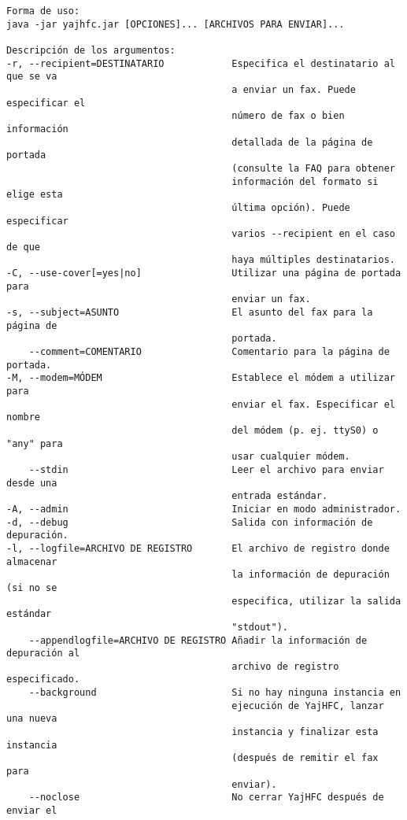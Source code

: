 \documentclass[a4paper,10pt]{scrartcl}
\begin{document}
\begin{verbatim}
Forma de uso:
java -jar yajhfc.jar [OPCIONES]... [ARCHIVOS PARA ENVIAR]...

Descripción de los argumentos:
-r, --recipient=DESTINATARIO            Especifica el destinatario al que se va
                                        a enviar un fax. Puede especificar el
                                        número de fax o bien información
                                        detallada de la página de portada
                                        (consulte la FAQ para obtener
                                        información del formato si elige esta
                                        última opción). Puede especificar
                                        varios --recipient en el caso de que
                                        haya múltiples destinatarios.
-C, --use-cover[=yes|no]                Utilizar una página de portada para
                                        enviar un fax.
-s, --subject=ASUNTO                    El asunto del fax para la página de
                                        portada.
    --comment=COMENTARIO                Comentario para la página de portada.
-M, --modem=MÓDEM                       Establece el módem a utilizar para
                                        enviar el fax. Especificar el nombre
                                        del módem (p. ej. ttyS0) o "any" para
                                        usar cualquier módem.
    --stdin                             Leer el archivo para enviar desde una
                                        entrada estándar.
-A, --admin                             Iniciar en modo administrador.
-d, --debug                             Salida con información de depuración.
-l, --logfile=ARCHIVO DE REGISTRO       El archivo de registro donde almacenar
                                        la información de depuración (si no se
                                        especifica, utilizar la salida estándar
                                        "stdout").
    --appendlogfile=ARCHIVO DE REGISTRO Añadir la información de depuración al
                                        archivo de registro especificado.
    --background                        Si no hay ninguna instancia en
                                        ejecución de YajHFC, lanzar una nueva
                                        instancia y finalizar esta instancia
                                        (después de remitir el fax para
                                        enviar).
    --noclose                           No cerrar YajHFC después de enviar el

\end{verbatim}
\end{document}
